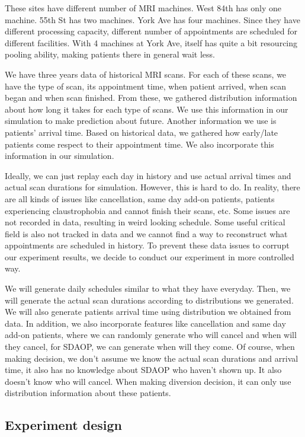 These sites have different number of MRI machines. West 84th has
only one machine. 55th St has two machines. York Ave has four machines.
Since they have different processing capacity, different number of
appointments are scheduled for different facilities. With 4 machines
at York Ave, itself has quite a bit resourcing pooling ability, making
patients there in general wait less.

We have three years data of historical MRI scans. For each of these
scans, we have the type of scan, its appointment time, when patient
arrived, when scan began and when scan finished. From these, we
gathered distribution information about how long it takes for each
type of scans. We use this information in our simulation to make
prediction about future. Another information we use is patients'
arrival time. Based on historical data, we gathered how early/late
patients come respect to their appointment time. We also incorporate
this information in our simulation.

Ideally, we can just replay each day in history and use actual arrival
times and actual scan durations for simulation. However, this is
hard to do. In reality, there are all kinds of issues like cancellation,
same day add-on patients, patients experiencing claustrophobia and cannot
finish their scans, etc. Some issues are not recorded in data, resulting
in weird looking schedule. Some useful critical field is also not tracked
in data and we cannot find a way to reconstruct what appointments are scheduled
in history. To prevent these data issues to corrupt our experiment results,
we decide to conduct our experiment in more controlled way.

We will generate daily schedules similar to what they have everyday. Then,
we will generate the actual scan durations according to distributions we
generated. We will also generate patients arrival time using distribution we
obtained from data. In addition, we also incorporate features like cancellation
and same day add-on patients, where we can randomly generate who will cancel
and when will they cancel, for SDAOP, we can generate when will they come.
Of course, when making decision, we don't assume we know the actual scan durations
and arrival time, it also has no knowledge about SDAOP who haven't shown up.
It also doesn't know who will cancel. When making diversion decision, it can
only use distribution information about these patients.

\subsection{Experiment design}

